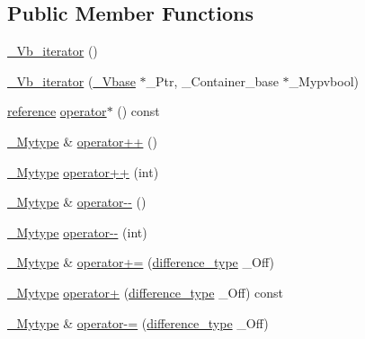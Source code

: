 \subsection*{Public Member Functions}
\begin{DoxyCompactItemize}
\item 
\hyperlink{class___vb__iterator_ac1d30a9ec5f9304ebf9856eea41f8768}{\+\_\+\+Vb\+\_\+iterator} ()
\item 
\hyperlink{class___vb__iterator_a259ac0c62c3d2ade3e451b622d9937c6}{\+\_\+\+Vb\+\_\+iterator} (\hyperlink{vector_8h_a1555a2f621ba9ade75bb9ce8bca77144}{\+\_\+\+Vbase} $\ast$\+\_\+\+Ptr, \+\_\+\+Container\+\_\+base $\ast$\+\_\+\+Mypvbool)
\item 
\hyperlink{class___vb__const__iterator_a15c6fa96bc01a672faec26fbaa7279f4}{reference} \hyperlink{class___vb__iterator_a44aebc25b6cfc48f07c432152dbeaeff}{operator$\ast$} () const 
\item 
\hyperlink{class___vb__const__iterator_acab47f643a88497fc0bb9c74afc59fde}{\+\_\+\+Mytype} \& \hyperlink{class___vb__iterator_aee7ea7599386765c1ee06623816e6552}{operator++} ()
\item 
\hyperlink{class___vb__const__iterator_acab47f643a88497fc0bb9c74afc59fde}{\+\_\+\+Mytype} \hyperlink{class___vb__iterator_a318d5bc0c8b61bcacf0005e274abf42e}{operator++} (int)
\item 
\hyperlink{class___vb__const__iterator_acab47f643a88497fc0bb9c74afc59fde}{\+\_\+\+Mytype} \& \hyperlink{class___vb__iterator_aab9b62a59fab1ef0454913af894e221e}{operator-\/-\/} ()
\item 
\hyperlink{class___vb__const__iterator_acab47f643a88497fc0bb9c74afc59fde}{\+\_\+\+Mytype} \hyperlink{class___vb__iterator_a174b7ac71912c9ac58f7616483133fd0}{operator-\/-\/} (int)
\item 
\hyperlink{class___vb__const__iterator_acab47f643a88497fc0bb9c74afc59fde}{\+\_\+\+Mytype} \& \hyperlink{class___vb__iterator_aaf8d830a65c1968c3086d8fbca761655}{operator+=} (\hyperlink{class___vb__const__iterator_a5966ee8cd6e57759253addfa4821de91}{difference\+\_\+type} \+\_\+\+Off)
\item 
\hyperlink{class___vb__const__iterator_acab47f643a88497fc0bb9c74afc59fde}{\+\_\+\+Mytype} \hyperlink{class___vb__iterator_ae754ace3f1b47879b156e94330ec720d}{operator+} (\hyperlink{class___vb__const__iterator_a5966ee8cd6e57759253addfa4821de91}{difference\+\_\+type} \+\_\+\+Off) const 
\item 
\hyperlink{class___vb__const__iterator_acab47f643a88497fc0bb9c74afc59fde}{\+\_\+\+Mytype} \& \hyperlink{class___vb__iterator_a526df7970bf944cea861058d24f7ba44}{operator-\/=} (\hyperlink{class___vb__const__iterator_a5966ee8cd6e57759253addfa4821de91}{difference\+\_\+type} \+\_\+\+Off)

\end{DoxyCompactItemize}
